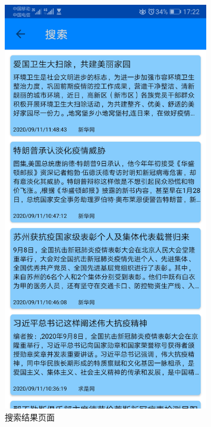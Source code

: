 \documentclass[UTF8]{article}
\begin{document}
\begin{figure}[htbp]
{\begin{minipage}[t]{0.3\linewidth}
    \includegraphics[width=0.8\textwidth]{search3}
    \end{minipage}%
    }%

    \centering
    \caption{搜索结果页面}
    \end{figure}
\end{document}
